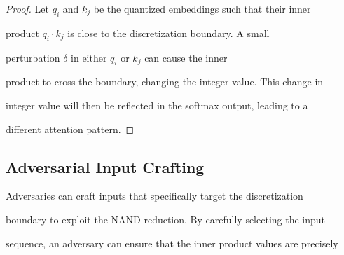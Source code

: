 \begin{proof}






Let \( q_i \) and \( k_j \) be the quantized embeddings such that their inner






product \( q_i \cdot k_j \) is close to the discretization boundary. A small






perturbation \( \delta \) in either \( q_i \) or \( k_j \) can cause the inner






product to cross the boundary, changing the integer value. This change in






integer value will then be reflected in the softmax output, leading to a






different attention pattern.






\end{proof}













\subsection{Adversarial Input Crafting}













Adversaries can craft inputs that specifically target the discretization






boundary to exploit the NAND reduction. By carefully selecting the input






sequence, an adversary can ensure that the inner product values are precisely







